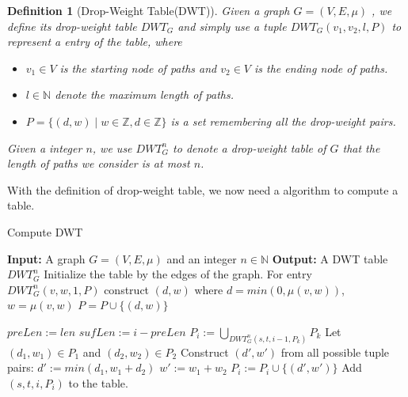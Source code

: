 \documentclass{article}
\newtheorem{definition}{Definition}
\begin{document}
\begin{definition}[Drop-Weight Table(DWT)]

Given a graph $G = (V, E, \mu)$ , we define its drop-weight table $DWT_{G}$ and simply use a tuple $DWT_{G}(v_1, v_2, l, P)$ to represent a entry of the table, where

\begin{itemize}
\item $v_1\in V$ is the starting node of  paths and $v_2\in V$ is the ending node of paths.

\item $l\in \mathbb{N}$ denote the maximum length of paths.

\item $P = \{(d,w)\mid w\in \mathbb{Z}, d\in \mathbb{Z}\}$ is a set remembering all the  drop-weight pairs.

\end{itemize}



Given a integer $n$, we use $DWT_{G}^n$ to denote a drop-weight table of $G$ that the length of paths we consider is at most $n$.
\end{definition}


With the definition of drop-weight table, we now need a algorithm to compute a table.

\begin{algorithm}
	\caption{Compute DWT}
	\begin{algorithmic}
		
		\State {}			
		\State \textbf{Input:} A graph $G = (V,E,\mu)$ and an integer $n\in \mathbb{N}$
		\State \textbf{Output:} A DWT table $DWT_G^n$
		\State \Comment Initialize the table by the edges of the graph.
				\State For entry $DWT_G^n(v,w,1,P)$
				\State construct $(d,w)$ where
				\State $d = min(0, \mu(v,w))$, $w = \mu(v,w)$
				\State $P = P \cup \{(d,w)\}$
			\EndFor
		\EndFor
		
		\State
		
				\State $preLen := len$
				\State $sufLen := i - preLen$	
				\State $P_i := \bigcup_{DWT_G^n(s,t,i-1,P_k)} P_k$		
							\State Let $(d_1, w_1)\in P_1$ and $(d_2, w_2)\in P_2$
							\State Construct $(d',w')$ from all possible tuple pairs:
							\State $d' := min(d_1, w_1+d_2)$
							\State $w' := w_1 + w_2$
							\State $P_i := P_i \cup \{(d',w')\}$							
							\EndFor
						\EndFor
						\State Add $(s,t,i,P_i)$ to the table.
					\EndFor
				\EndFor
			\EndFor
		\EndFor
		\EndFunction

	\end{algorithmic}
\end{algorithm}
\end{document}
